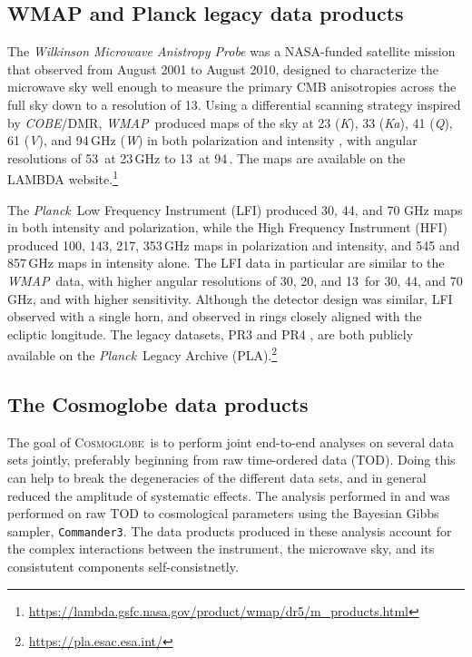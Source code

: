 \documentclass[twocolumn]{../../common/aa}
\def\WMAP{\emph{WMAP}}
\def\COBE{\emph{COBE}}
\def\Planck{\emph{Planck}}
\def\commanderthree{\texttt{Commander3}}
\newcommand{\Cosmoglobe}{\textsc{Cosmoglobe}}
\newcommand{\K}[0]{\textit K}
\newcommand{\Ka}[0]{\textit{Ka}}
\newcommand{\Q}[0]{\textit Q}
\newcommand{\V}[0]{\textit V}
\newcommand{\W}[0]{\textit W}
\begin{document}
\subsection{WMAP and Planck legacy data products}
\label{sec:wmap_data}

The \textit{Wilkinson Microwave Anistropy Probe} \citep[\WMAP]{bennett2012} was a NASA-funded satellite mission that observed from August 2001 to August 2010, designed to characterize the microwave sky well enough to measure the primary CMB anisotropies across the full sky down to a resolution of 13\arcm. Using a differential scanning strategy inspired by \COBE/DMR,
\WMAP\ produced maps of the sky at 23 (\K), 33 (\Ka), 41 (\Q), 61 (\V), and 94\,GHz (\W) in both polarization and intensity \citep{bennett2012}, with angular resolutions of 53\arcm\ at 23\,GHz to 13\arcm\ at 94\,\GHz. 
The maps are available on the LAMBDA website.\footnote{\url{https://lambda.gsfc.nasa.gov/product/wmap/dr5/m_products.html}} 

The \Planck\ Low Frequency Instrument (LFI) produced  30, 44, and 70 GHz maps in both intensity and polarization, while the High Frequency Instrument (HFI) produced 100, 143, 217, 353\,GHz maps in polarization and intensity, and 545 and 857\,GHz maps in intensity alone. The LFI data in particular are similar to the \WMAP\ data, with higher angular resolutions of 30\arcm, 20\arcm, and 13\arcm\ for 30, 44, and 70 GHz, and with higher sensitivity. Although the detector design was similar, LFI observed with a single horn, and observed in rings closely aligned with the ecliptic longitude. The legacy datasets, PR3 \citep{planck2016-l01} and PR4 \citep{planck2020-LVII}, are both publicly available on the \Planck\ Legacy Archive (PLA).\footnote{\url{https://pla.esac.esa.int/}}

\subsection{The Cosmoglobe data products}
\label{sec:cosmoglobe_data}

The goal of \Cosmoglobe\ is to perform joint end-to-end analyses on several data sets jointly, preferably beginning from raw time-ordered data (TOD). Doing this can help to break the degeneracies of the different data sets, and in general reduced the amplitude of systematic effects. The analysis performed in \citet{bp01} and \citet{watts2023_dr1} was performed on raw TOD to cosmological parameters using the Bayesian Gibbs sampler, \commanderthree. The data products produced in these analysis account for the complex interactions between the instrument, the microwave sky, and its consistutent components self-consistnetly.
\end{document}
